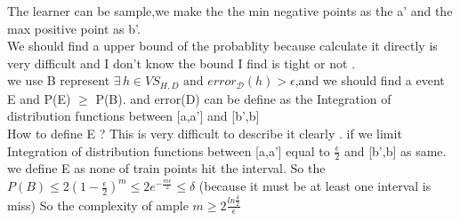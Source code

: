 \documentclass[11pt,letter,notitlepage]{article}
\begin{document}
\begin{solution}
	\indent	The learner can be sample,we make the  the min negative points as the a' and the max positive point as b'.\\
	\indent We should find a upper bound of the probablity because calculate it directly is very difficult and I don't know the bound I find is tight or not .\\
	 \indent	we use B represent $\exists\, h\in VS_{H,D} \mbox{ and } error_{\mathcal{D}}(h)>\epsilon$,and we should find a event E and P(E) $\geq$ P(B). and error(D) can be define as the Integration of distribution functions between [a,a'] and [b',b]\\
 	\indent How to define E ? This is  very difficult to describe it clearly .  
 	if we limit  Integration of distribution functions between [a,a'] equal to $\frac{\epsilon}{2}$ and [b',b] as same.
 	we define E as none of train points hit the interval.
 	So the $P(B) \leq 2(1 - \frac{\epsilon}{2} )^ m \leq 2e^{-\frac{m\epsilon}{2}} \leq \delta$ (because it must be at least one interval is miss)
 	So the complexity of ample $ m \geq 2\frac{ln\frac{\delta}{2}} {\epsilon}$
\end{solution}
\end{document}

